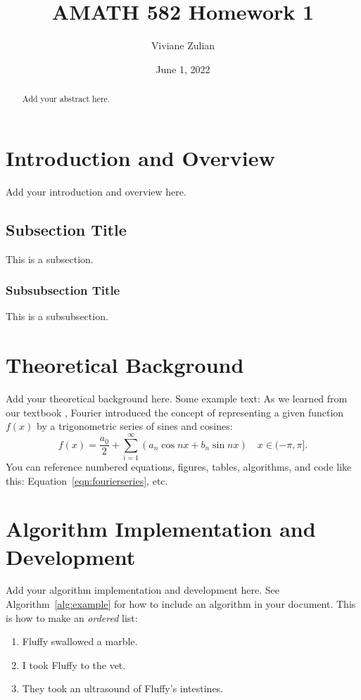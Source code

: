 \documentclass{article}
\title{AMATH 582 Homework 1}
\author{Viviane Zulian}
\date{June 1, 2022}
\begin{document}
\maketitle

\begin{abstract}
    Add your abstract here.
\end{abstract}

\section{Introduction and Overview}
Add your introduction and overview here.

\subsection{Subsection Title}
This is a subsection.

\subsubsection{Subsubsection Title}
This is a subsubsection.

\section{Theoretical Background}
Add your theoretical background here. Some example text: As we learned from our textbook \cite{kutz_2013}, Fourier introduced the concept of representing a given function $f(x)$ by a trigonometric series of sines and cosines:
\begin{equation}
    f(x) = \frac{a_0}{2} + \sum_{i=1}^\infty \left(a_n\cos{nx} + b_n\sin{nx}\right) \quad x \in (-\pi,\pi].
    \label{eqn:fourierseries}
\end{equation}
You can reference numbered equations, figures, tables, algorithms, and code like this: Equation~\ref{eqn:fourierseries}, etc.

\section{Algorithm Implementation and Development}
Add your algorithm implementation and development here. See Algorithm~\ref{alg:example} for how to include an algorithm in your document. This is how to make an \textit{ordered} list:
\begin{enumerate}
    \item Fluffy swallowed a marble.
    \item I took Fluffy to the vet.
    \item They took an ultrasound of Fluffy's intestines.
\end{enumerate}
\end{document}
